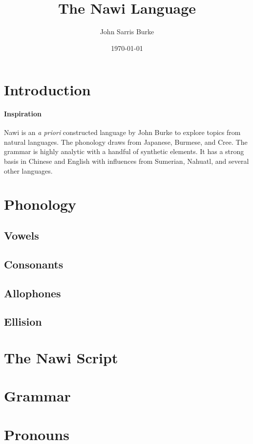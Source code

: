 \documentclass[10pt]{article}
\title{The Nawi Language}
\date{\today}
\author{John Sarris Burke}
\begin{document}
\maketitle

\tableofcontents

\pagebreak

\pagebreak

\section{Introduction}

\paragraph{Inspiration}
Nawi is an {\em a priori} constructed language by John Burke to explore topics from natural languages.  The phonology draws from Japanese, Burmese, and Cree.  The grammar is highly analytic with a handful of synthetic elements.  It has a strong basis in Chinese and English with influences from Sumerian, Nahuatl, and several other languages.

\section{Phonology}
	\subsection{Vowels}
	\subsection{Consonants}
	\subsection{Allophones}
	\subsection{Ellision}
\section{The Nawi Script}
\section{Grammar}
\section{Pronouns}
\end{document}
